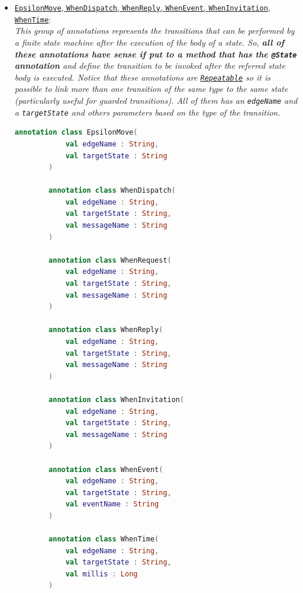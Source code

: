 \begin{itemize}
	\item \href{https://github.com/LM-96/QA-Extensions/blob/main/it.unibo.qakactor/src/main/kotlin/annotations/Transitions.kt}{
		\textcolor{YellowOrange}{\underline{\texttt{EpsilonMove}}},
		\textcolor{YellowOrange}{\underline{\texttt{WhenDispatch}}}, \textcolor{YellowOrange}{\underline{\texttt{WhenReply}}},
		\textcolor{YellowOrange}{\underline{\texttt{WhenEvent}}},
		\textcolor{YellowOrange}{\underline{\texttt{WhenInvitation}}},
		\textcolor{YellowOrange}{\underline{\texttt{WhenTime}}}}:\\
	\textit{This group of annotations represents the transitions that can be performed by a finite state machine after the execution of the body of a state. So, \textbf{all of these annotations have sense if put to a method that has the \texttt{@State} annotation} and define the transition to be \textit{invoked} after the referred state body is executed. Notice that these annotations are \href{https://kotlinlang.org/api/latest/jvm/stdlib/kotlin.annotation/-repeatable/}{\texttt{Repeatable}} so it is possible to link more than one transition of the same type to the same state (particularly useful for \textit{guarded} transitions). All of them has an \texttt{edgeName} and a \texttt{targetState} and others parameters based on the type of the transition.}
	\begin{lstlisting}[numbers=none,language=Kotlin]
		annotation class EpsilonMove(
			val edgeName : String,
			val targetState : String
		)
		
		annotation class WhenDispatch(
			val edgeName : String,
			val targetState : String,
			val messageName : String
		)
		
		annotation class WhenRequest(
			val edgeName : String,
			val targetState : String,
			val messageName : String
		)
		
		annotation class WhenReply(
			val edgeName : String,
			val targetState : String,
			val messageName : String
		)
		
		annotation class WhenInvitation(
			val edgeName : String,
			val targetState : String,
			val messageName : String
		)
		
		annotation class WhenEvent(
			val edgeName : String,
			val targetState : String,
			val eventName : String
		)
		
		annotation class WhenTime(
			val edgeName : String,
			val targetState : String,
			val millis : Long
		)
	\end{lstlisting}


\end{itemize}
